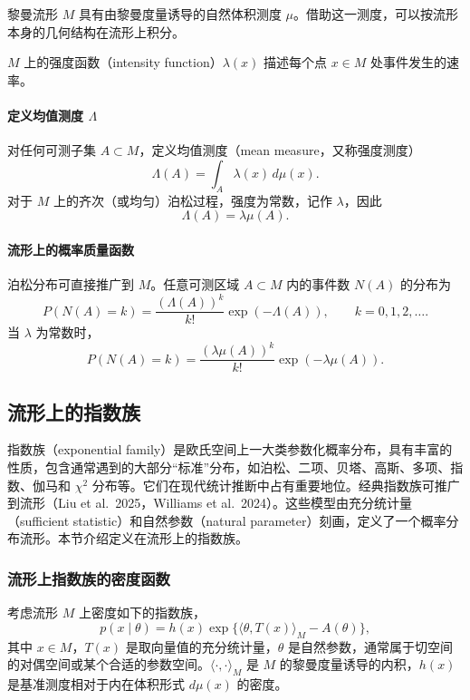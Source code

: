 黎曼流形 $M$ 具有由黎曼度量诱导的自然体积测度 $\mu$。借助这一测度，可以按流形本身的几何结构在流形上积分。

$M$ 上的强度函数（intensity function）$\lambda(x)$ 描述每个点 $x\in M$ 处事件发生的速率。

\paragraph{定义均值测度 \texorpdfstring{$\Lambda$}{Λ}}

对任何可测子集 $A\subset M$，定义均值测度（mean measure，又称强度测度）
\[
  \Lambda(A)=\int_A \lambda(x)\,d\mu(x).
\]
对于 $M$ 上的齐次（或均匀）泊松过程，强度为常数，记作 $\lambda$，因此
\[
  \Lambda(A)=\lambda\mu(A).
\]

\paragraph{流形上的概率质量函数}

泊松分布可直接推广到 $M$。任意可测区域 $A\subset M$ 内的事件数 $N(A)$ 的分布为
\[
  P(N(A)=k)=\frac{(\Lambda(A))^k}{k!}\exp(-\Lambda(A)),
  \qquad k=0,1,2,\ldots.
\]
当 $\lambda$ 为常数时，
\[
  P(N(A)=k)=\frac{(\lambda\mu(A))^k}{k!}\exp(-\lambda\mu(A)).
\]

\subsection{流形上的指数族}

指数族（exponential family）是欧氏空间上一大类参数化概率分布，具有丰富的性质，包含通常遇到的大部分“标准”分布，如泊松、二项、贝塔、高斯、多项、指数、伽马和 $\chi^2$ 分布等。它们在现代统计推断中占有重要地位。经典指数族可推广到流形（Liu et al.\ 2025，Williams et al.\ 2024）。这些模型由充分统计量（sufficient statistic）和自然参数（natural parameter）刻画，定义了一个概率分布流形。本节介绍定义在流形上的指数族。

\subsubsection{流形上指数族的密度函数}

考虑流形 $M$ 上密度如下的指数族，
\[
  p(x\mid\theta)=h(x)\exp\{\langle\theta,T(x)\rangle_M-A(\theta)\},
\]
其中 $x\in M$，$T(x)$ 是取向量值的充分统计量，$\theta$ 是自然参数，通常属于切空间的对偶空间或某个合适的参数空间。$\langle\cdot,\cdot\rangle_M$ 是 $M$ 的黎曼度量诱导的内积，$h(x)$ 是基准测度相对于内在体积形式 $d\mu(x)$ 的密度。

